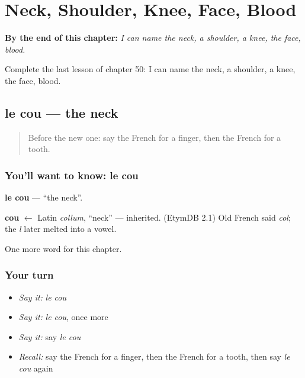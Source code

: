 
\chapter{Neck, Shoulder, Knee, Face, Blood}
\label{ch:fr-neck-shoulder-knee-face-blood}

\begin{chapteropening}
\textbf{By the end of this chapter:} \emph{I can name the neck, a shoulder, a knee, the face, blood.}

Complete the last lesson of chapter 50: I can name the neck, a shoulder, a knee, the face, blood.
\end{chapteropening}

\section[le cou]{le cou — the neck}

\label{lesson:FR-C50-cou}



\begin{quote}
Before the new one: say the French for a finger, then the French for a tooth.
\end{quote}

\subsection*{You'll want to know: le cou}
\textbf{le cou} — \textquotedblleft{}the neck\textquotedblright{}.

\begin{cousinweb}
\textbf{cou} $\leftarrow$ Latin \emph{collum}, \textquotedblleft{}neck\textquotedblright{} — inherited. (EtymDB 2.1) Old French said \emph{col}; the \emph{l} later melted into a vowel.
\end{cousinweb}

\begin{grammarlens}[title={What you've built}]
One more word for this chapter.
\end{grammarlens}

\subsection*{Your turn}
\begin{itemize}
\raggedright
  \item \emph{Say it:} \emph{le cou}
  \item \emph{Say it:} \emph{le cou}, once more
  \item \emph{Say it:} say \emph{le cou}
  \item \emph{Recall:} say the French for a finger, then the French for a tooth, then say \emph{le cou} again
\end{itemize}

